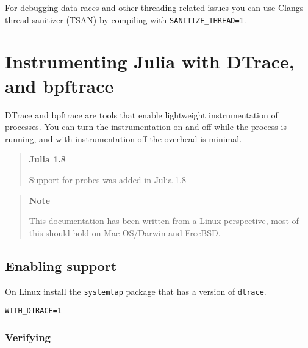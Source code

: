 For debugging data-races and other threading related issues you can use Clang{\textquotesingle}s \href{https://clang.llvm.org/docs/ThreadSanitizer.html}{thread sanitizer (TSAN)} by compiling with \texttt{SANITIZE\_THREAD=1}.



\hypertarget{4644242585410635176}{}


\section{Instrumenting Julia with DTrace, and bpftrace}



DTrace and bpftrace are tools that enable lightweight instrumentation of processes. You can turn the instrumentation on and off while the process is running, and with instrumentation off the overhead is minimal.



\begin{quote}
\textbf{Julia 1.8}

Support for probes was added in Julia 1.8

\end{quote}


\begin{quote}
\textbf{Note}

This documentation has been written from a Linux perspective, most of this should hold on Mac OS/Darwin and FreeBSD.

\end{quote}


\hypertarget{10219409411331572644}{}


\subsection{Enabling support}



On Linux install the \texttt{systemtap} package that has a version of \texttt{dtrace}.




\begin{lstlisting}
WITH_DTRACE=1
\end{lstlisting}



\hypertarget{9303790172260158252}{}


\subsubsection{Verifying}





